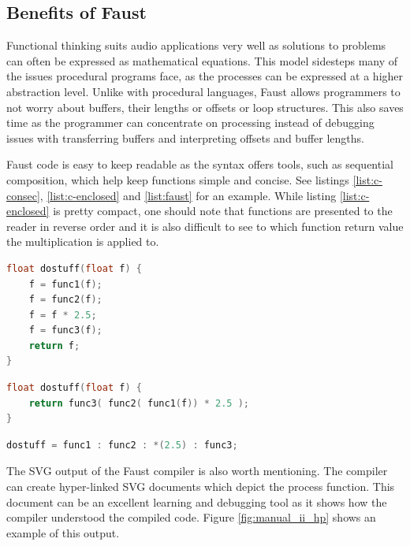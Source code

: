 \documentclass[11pt,a4paper]{article}
\begin{document}
\subsection{Benefits of Faust}

Functional thinking suits audio applications very well as solutions to problems can often be expressed as mathematical equations. This model sidesteps many of the issues procedural programs face, as the processes can be expressed at a higher abstraction level. Unlike with procedural languages, Faust allows programmers to not worry about buffers, their lengths or offsets or loop structures. This also saves time as the programmer can concentrate on processing instead of debugging issues with transferring buffers and interpreting offsets and buffer lengths.

Faust code is easy to keep readable as the syntax offers tools, such as sequential composition, which help keep functions simple and concise. See listings \ref{list:c-consec}, \ref{list:c-enclosed} and \ref{list:faust} for an example. While listing \ref{list:c-enclosed} is pretty compact, one should note that functions are presented to the reader in reverse order and it is also difficult to see to which function return value the multiplication is applied to.

\begin{lstlisting}[language=C,label=list:c-consec,caption=Consecutive calls]
float dostuff(float f) {
	f = func1(f);
	f = func2(f);
	f = f * 2.5;
	f = func3(f);
	return f;
}
\end{lstlisting}

\begin{lstlisting}[language=C,label=list:c-enclosed,caption=Enclosed statements]
float dostuff(float f) {
	return func3( func2( func1(f)) * 2.5 );
}
\end{lstlisting}

\begin{lstlisting}[language=C,label=list:faust,caption=Faust sequential composition]
dostuff = func1 : func2 : *(2.5) : func3;
\end{lstlisting}

The SVG output of the Faust compiler is also worth mentioning. The compiler can create hyper-linked SVG documents which depict the process function. This document can be an excellent learning and debugging tool as it shows how the compiler understood the compiled code. Figure \ref{fig:manual_ii_hp} shows an example of this output.
\end{document}
